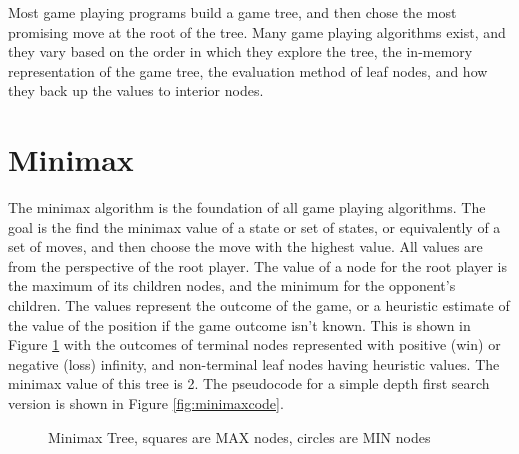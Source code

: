 

Most game playing programs build a game tree, and then chose the most promising move at the root of the tree. Many game playing algorithms exist, and they vary based on the order in which they explore the tree, the in-memory representation of the game tree, the evaluation method of leaf nodes, and how they back up the values to interior nodes.

\section{Minimax}

The minimax algorithm is the foundation of all game playing algorithms. The goal is the find the minimax value of a state or set of states, or equivalently of a set of moves, and then choose the move with the highest value. All values are from the perspective of the root player. The value of a node for the root player is the maximum of its children nodes, and the minimum for the opponent's children. The values represent the outcome of the game, or a heuristic estimate of the value of the position if the game outcome isn't known. This is shown in Figure \ref{fig:minimaxtree} with the outcomes of terminal nodes represented with positive (win) or negative (loss) infinity, and non-terminal leaf nodes having heuristic values. The minimax value of this tree is 2. The pseudocode for a simple depth first search version is shown in Figure \ref{fig:minimaxcode}.

\begin{figure}
\centering
{}
\caption[Minimax Tree]{Minimax Tree, squares are MAX nodes, circles are MIN nodes}
\label{fig:minimaxtree}
\end{figure}


